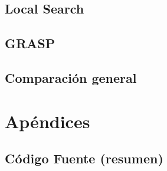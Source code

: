 \documentclass[12pt, a4paper, twoside]{article}
\begin{document}
\begin{TP3}
  \subsection{Local Search}\label{subsec:local}
  
  \newpage

  \subsection{GRASP}\label{subsec:grasp}
  
  \newpage

  \subsection{Comparación general}\label{subsec:comparativa}
  
  
	
  \newpage
\section{Apéndices}\label{sec:apendices}
  
  \subsection{Código Fuente (resumen)}\label{subsec:codigo-fuente}
  
  \clearpage
  
  
% 


\end{TP3}
\end{document}
